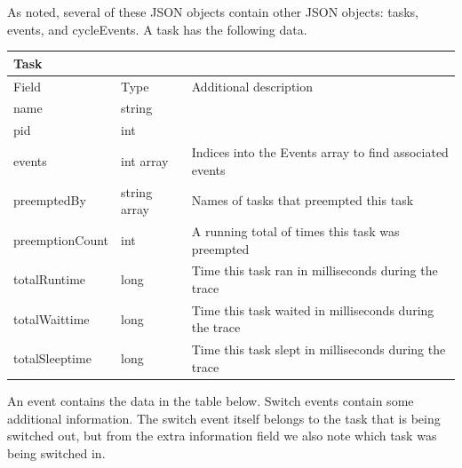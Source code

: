 \documentclass{hmcclinic}
\begin{document}
  As noted, several of these JSON objects contain other JSON objects: tasks,
  events, and cycleEvents. A task has the following data.

  \begin{center}
    \begin{tabular}{lll}
      Task      &        &                                        \\
      \hline
      Field           & Type         & Additional description \\
      \hline
      name            & string       & \\
      pid             & int          & \\
      events          & int array    & Indices into the Events array to find associated events\\
      preemptedBy     & string array & Names of tasks that preempted this task \\
      preemptionCount & int          & A running total of times this task was preempted                    \\
      totalRuntime    & long         & Time this task ran in milliseconds during the trace        \\
      totalWaittime   & long         & Time this task waited in milliseconds during the trace     \\
      totalSleeptime  & long         & Time this task slept in milliseconds during the trace     
    \end{tabular}
  \end{center}

  An event contains the data in the table below. Switch events contain some additional
  information. The switch event itself belongs to the task that is being
  switched out, but from the extra information field we also note which task
  was being switched in.
\end{document}
